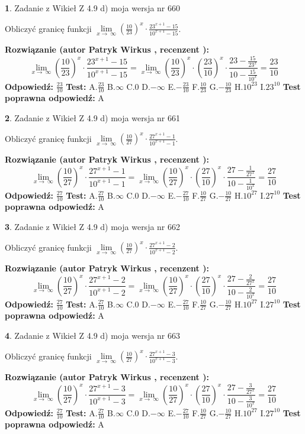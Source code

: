 \documentclass[12pt, a4paper]{article}
\theoremstyle{definition} %
\newtheorem{zad}{}
\newcommand{\zadStart}[1]{\begin{zad}#1\newline}
\newcommand{\zadStop}{\end{zad}}
\newcommand{\rozwStart}[2]{\noindent \textbf{Rozwiązanie (autor #1 , recenzent #2): }\newline}
\newcommand{\rozwStop}{\newline}
\newcommand{\odpStart}{\noindent \textbf{Odpowiedź:}\newline}
\newcommand{\odpStop}{\newline}
\newcommand{\testStart}{\noindent \textbf{Test:}\newline}
\newcommand{\testStop}{\newline}
\newcommand{\kluczStart}{\noindent \textbf{Test poprawna odpowiedź:}\newline}
\newcommand{\kluczStop}{\newline}
\begin{document}
\zadStart{Zadanie z Wikieł Z 4.9 d) moja wersja nr 660}


Obliczyć granicę funkcji  $\lim\limits_{x\to\ \infty}(\frac{10}{23})^{x}\cdot\frac{23^{x+1}-15}{10^{x+1}-15}$.
\zadStop
\rozwStart{Patryk Wirkus}{}
$$\lim\limits_{x\to\ \infty}(\frac{10}{23})^{x}\cdot\frac{23^{x+1}-15}{10^{x+1}-15}=\lim\limits_{x\to\ \infty}(\frac{10}{23})^{x}\cdot(\frac{23}{10})^{x} \cdot \frac{23-\frac{15}{23^{x}}}{10-\frac{15}{10^{x}}} = \frac{23}{10}$$
\rozwStop
\odpStart
$\frac{23}{10}$
\odpStop
\testStart
A.$\frac{23}{10}$ B.$\infty$ C.$0$ D.$-\infty$ E.$-\frac{23}{10}$
F.$\frac{10}{23}$ G.$-\frac{10}{23}$
H.$10^{23}$
I.$23^{10}$
\testStop
\kluczStart
A
\kluczStop



\zadStart{Zadanie z Wikieł Z 4.9 d) moja wersja nr 661}


Obliczyć granicę funkcji  $\lim\limits_{x\to\ \infty}(\frac{10}{27})^{x}\cdot\frac{27^{x+1}-1}{10^{x+1}-1}$.
\zadStop
\rozwStart{Patryk Wirkus}{}
$$\lim\limits_{x\to\ \infty}(\frac{10}{27})^{x}\cdot\frac{27^{x+1}-1}{10^{x+1}-1}=\lim\limits_{x\to\ \infty}(\frac{10}{27})^{x}\cdot(\frac{27}{10})^{x} \cdot \frac{27-\frac{1}{27^{x}}}{10-\frac{1}{10^{x}}} = \frac{27}{10}$$
\rozwStop
\odpStart
$\frac{27}{10}$
\odpStop
\testStart
A.$\frac{27}{10}$ B.$\infty$ C.$0$ D.$-\infty$ E.$-\frac{27}{10}$
F.$\frac{10}{27}$ G.$-\frac{10}{27}$
H.$10^{27}$
I.$27^{10}$
\testStop
\kluczStart
A
\kluczStop



\zadStart{Zadanie z Wikieł Z 4.9 d) moja wersja nr 662}


Obliczyć granicę funkcji  $\lim\limits_{x\to\ \infty}(\frac{10}{27})^{x}\cdot\frac{27^{x+1}-2}{10^{x+1}-2}$.
\zadStop
\rozwStart{Patryk Wirkus}{}
$$\lim\limits_{x\to\ \infty}(\frac{10}{27})^{x}\cdot\frac{27^{x+1}-2}{10^{x+1}-2}=\lim\limits_{x\to\ \infty}(\frac{10}{27})^{x}\cdot(\frac{27}{10})^{x} \cdot \frac{27-\frac{2}{27^{x}}}{10-\frac{2}{10^{x}}} = \frac{27}{10}$$
\rozwStop
\odpStart
$\frac{27}{10}$
\odpStop
\testStart
A.$\frac{27}{10}$ B.$\infty$ C.$0$ D.$-\infty$ E.$-\frac{27}{10}$
F.$\frac{10}{27}$ G.$-\frac{10}{27}$
H.$10^{27}$
I.$27^{10}$
\testStop
\kluczStart
A
\kluczStop



\zadStart{Zadanie z Wikieł Z 4.9 d) moja wersja nr 663}


Obliczyć granicę funkcji  $\lim\limits_{x\to\ \infty}(\frac{10}{27})^{x}\cdot\frac{27^{x+1}-3}{10^{x+1}-3}$.
\zadStop
\rozwStart{Patryk Wirkus}{}
$$\lim\limits_{x\to\ \infty}(\frac{10}{27})^{x}\cdot\frac{27^{x+1}-3}{10^{x+1}-3}=\lim\limits_{x\to\ \infty}(\frac{10}{27})^{x}\cdot(\frac{27}{10})^{x} \cdot \frac{27-\frac{3}{27^{x}}}{10-\frac{3}{10^{x}}} = \frac{27}{10}$$
\rozwStop
\odpStart
$\frac{27}{10}$
\odpStop
\testStart
A.$\frac{27}{10}$ B.$\infty$ C.$0$ D.$-\infty$ E.$-\frac{27}{10}$
F.$\frac{10}{27}$ G.$-\frac{10}{27}$
H.$10^{27}$
I.$27^{10}$
\testStop
\kluczStart
A
\kluczStop
\end{document}
